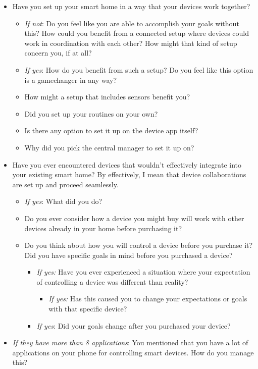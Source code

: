 \begin{itemize}
    \item Have you set up your smart home in a way that your devices work together?
    \begin{itemize}
        \item \textit{If not}: Do you feel like you are able to accomplish your goals without this? How could you benefit from a connected setup where devices could work in coordination with each other? How might that kind of setup concern you, if at all?
        \item \textit{If yes}: How do you benefit from such a setup? Do you feel like this option is a gamechanger in any way?
        \item How might a setup that includes sensors benefit you?
        \item Did you set up your routines on your own?
        \item Is there any option to set it up on the device app itself?
        \item Why did you pick the central manager to set it up on?
    \end{itemize}
\end{itemize}
\begin{itemize}
    \item Have you ever encountered devices that wouldn't effectively integrate into your existing smart home? By effectively, I mean that device collaborations are set up and proceed seamlessly.
    \begin{itemize}
        \item \textit{If yes}: What did you do?
        \item Do you ever consider how a device you might buy will work with other devices already in your home before purchasing it?
        \item Do you think about how you will control a device before you purchase it? Did you have specific goals in mind before you purchased a device?
        \begin{itemize}
            \item \textit{If yes:} Have you ever experienced a situation where your expectation of controlling a device was different than reality?
                \begin{itemize}
                    \item \textit{If yes:} Has this caused you to change your expectations or goals with that specific device?
                \end{itemize}
            \item \textit{If yes}: Did your goals change after you purchased your device?
        \end{itemize}
    \end{itemize}
\end{itemize}
\begin{itemize}
    \item \textit{If they have more than 8 applications}: You mentioned that you have a lot of applications on your phone for controlling smart devices. How do you manage this? 
\end{itemize}

